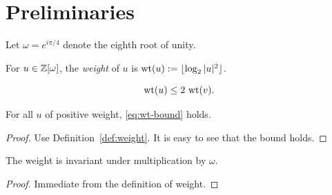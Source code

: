 \section{Preliminaries}\label{sec:prelim}
Let $\omega = e^{i\pi/4}$ denote the eighth root of unity.

\begin{definition}[Weight]\label{def:weight}
For $u\in\mathbb{Z}[\omega]$, the \emph{weight} of $u$ is $\operatorname{wt}(u) := \lfloor \log_2 |u|^2 \rfloor$.
\end{definition}

\begin{equation}\label{eq:wt-bound}
\operatorname{wt}(u) \le 2\,\operatorname{wt}(v).
\end{equation}

\begin{lemma}\label{lem:bound}
For all $u$ of positive weight, \eqref{eq:wt-bound} holds.
\end{lemma}
\begin{proof}
Use Definition~\ref{def:weight}. It is easy to see that the bound holds.
\end{proof}

\begin{lemma}\label{lem:second}
The weight is invariant under multiplication by $\omega$.
\end{lemma}
\begin{proof}
Immediate from the definition of weight.
\end{proof}
